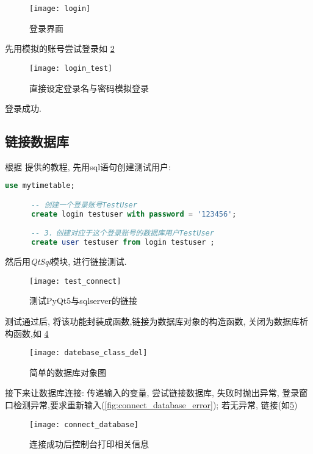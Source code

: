 \documentclass{myreport}
\begin{document}
    \begin{figure}[H]
      \centering
      \texttt{[image: login]}
      \caption{登录界面}
      \label{fig:login}
    \end{figure}
    先用模拟的账号尝试登录如
    \cref{fig:login_test}
    \begin{figure}[H]
      \centering
      \texttt{[image: login\_test]}
      \caption{直接设定登录名与密码模拟登录}
      \label{fig:login_test}
    \end{figure}
    登录成功.
  \subsection{链接数据库}
    根据 \cite{connect_database} 提供的教程, 先用sql语句创建测试用户:
    \begin{lstlisting}[language=sql]
      use mytimetable;

      -- 创建一个登录账号TestUser
      create login testuser with password = '123456';

      -- 3．创建对应于这个登录账号的数据库用户TestUser
      create user testuser from login testuser ;
    \end{lstlisting}
    然后用\emph{QtSql}模块, 进行链接测试.
    \begin{figure}[H]
      \centering
      \texttt{[image: test\_connect]}
      \caption{测试PyQt5与sqlserver的链接}
      \label{fig:test_connect}
    \end{figure}

    测试通过后, 将该功能封装成函数,链接为数据库对象的构造函数,
    关闭为数据库析构函数,如
    \cref{fig:datebase_class_del}
    \begin{figure}[H]
      \centering
      \texttt{[image: datebase\_class\_del]}
      \caption{简单的数据库对象图}
      \label{fig:datebase_class_del}
    \end{figure}

    接下来让数据库连接:
    传递输入的变量, 尝试链接数据库,
    失败时抛出异常, 登录窗口检测异常,要求重新输入(\cref{fig:connect_database_error}); 若无异常, 链接(如\cref{fig:connect_database})

    \begin{figure}[H]
      \centering
      \texttt{[image: connect\_database]}
      \caption{连接成功后控制台打印相关信息}
      \label{fig:connect_database}
    \end{figure}
\end{document}
